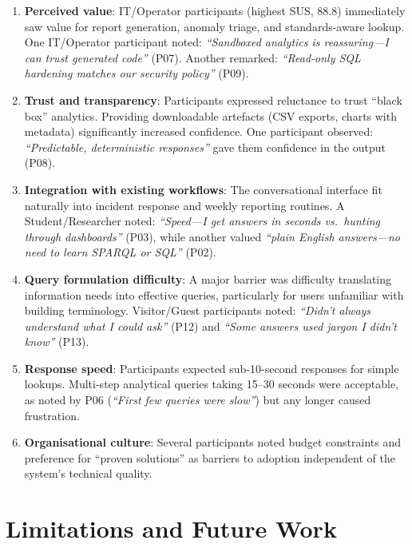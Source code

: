 \documentclass[acmsmall]{acmart}
\begin{document}
\begin{enumerate}
    \item \textbf{Perceived value}: IT/Operator participants (highest SUS, 88.8) immediately saw value for report generation, anomaly triage, and standards-aware lookup. One IT/Operator participant noted: \emph{``Sandboxed analytics is reassuring---I can trust generated code''} (P07). Another remarked: \emph{``Read-only SQL hardening matches our security policy''} (P09).
    \item \textbf{Trust and transparency}: Participants expressed reluctance to trust ``black box'' analytics. Providing downloadable artefacts (CSV exports, charts with metadata) significantly increased confidence. One participant observed: \emph{``Predictable, deterministic responses''} gave them confidence in the output (P08).
    \item \textbf{Integration with existing workflows}: The conversational interface fit naturally into incident response and weekly reporting routines. A Student/Researcher noted: \emph{``Speed---I get answers in seconds vs.\ hunting through dashboards''} (P03), while another valued \emph{``plain English answers---no need to learn SPARQL or SQL''} (P02).
    \item \textbf{Query formulation difficulty}: A major barrier was difficulty translating information needs into effective queries, particularly for users unfamiliar with building terminology. Visitor/Guest participants noted: \emph{``Didn't always understand what I could ask''} (P12) and \emph{``Some answers used jargon I didn't know''} (P13).
    \item \textbf{Response speed}: Participants expected sub-10-second responses for simple lookups. Multi-step analytical queries taking 15--30 seconds were acceptable, as noted by P06 (\emph{``First few queries were slow''}) but any longer caused frustration.
    \item \textbf{Organisational culture}: Several participants noted budget constraints and preference for ``proven solutions'' as barriers to adoption independent of the system's technical quality.
\end{enumerate}


\section{Limitations and Future Work}
\label{sec:future-work}
\end{document}
